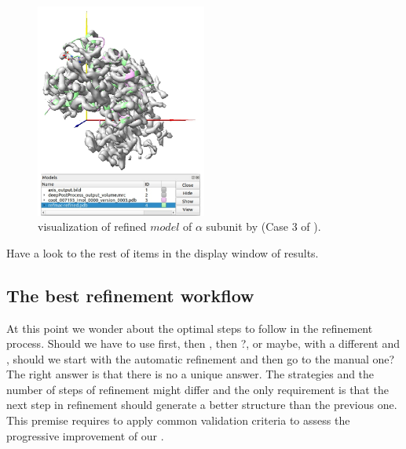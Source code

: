   \begin{figure}[H]
  \centering 
  \captionsetup{width=.9\linewidth} 
  \includegraphics[width=0.50\textwidth]{Images/Fig33}
  \caption{\chimera visualization of refined $model$ of  $\alpha$ subunit by  (Case 3 of ).}
  \label{fig:refmac_chimera}
  \end{figure}
  
  Have a look to the rest of items in the display window of results.
  
  \subsection*{The best refinement workflow}
  At this point we wonder about the optimal steps to follow in the refinement process. Should we have to use \coot first, then \phenix, then ?, or maybe, with a different  and , should we start with the automatic refinement and then go to the manual one? The right answer is that there is no a unique answer. The strategies and the number of steps of refinement might differ and the only requirement is that the next step in refinement should generate a better structure than the previous one. This premise requires to apply common validation criteria to assess the progressive improvement of our .
  

